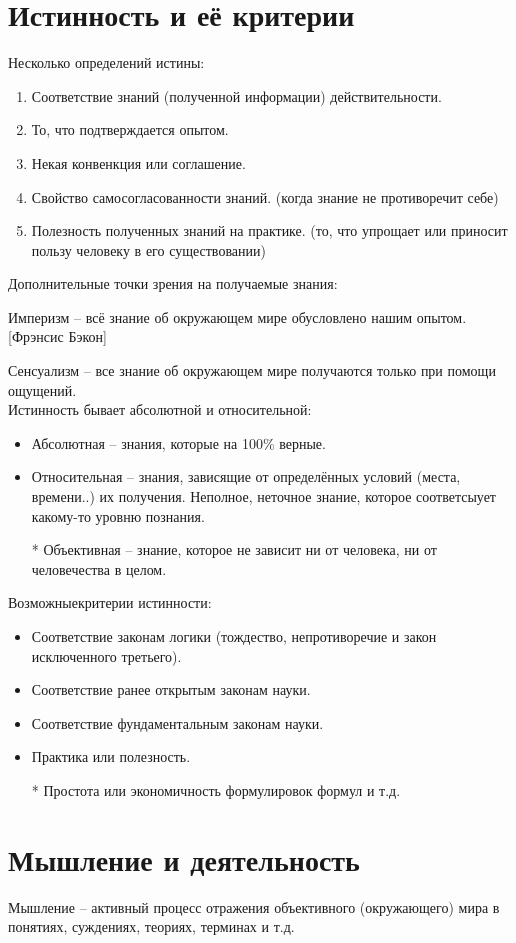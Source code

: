 \documentclass[12pt,a4paper]{book}
\begin{document}
\section{Истинность и её критерии}

Несколько определений истины:
\begin{enumerate}
	\item Соответствие знаний (полученной информации) действительности.
	\item То, что подтверждается опытом.
	\item Некая конвенкция или соглашение.
	\item Свойство самосогласованности знаний. (когда знание не противоречит себе)
	\item Полезность полученных знаний на практике. (то, что упрощает или приносит пользу человеку в его существовании)
\end{enumerate}
Дополнительные точки зрения на получаемые знания:

Империзм -- всё знание об окружающем мире обусловлено нашим опытом. [Фрэнсис Бэкон]

Сенсуализм -- все знание об окружающем мире получаются только при помощи ощущений.\\
Истинность бывает абсолютной и относительной:
\begin{itemize}
	\item Абсолютная -- знания, которые на 100\% верные.
	\item Относительная -- знания, зависящие от определённых условий (места, времени..) их получения. Неполное, неточное знание, которое соответсыует какому-то уровню познания.
	\item [*] Объективная -- знание, которое не зависит ни от человека, ни от человечества в целом.
\end{itemize}
Возможныекритерии истинности:
\begin{itemize}
	\item Соответствие законам логики (тождество, непротиворечие и закон исключенного третьего). 
	\item Соответствие ранее открытым законам науки. 
	\item Соответствие фундаментальным законам науки.
	\item Практика или полезность. 
	\item [*] Простота или экономичность формулировок формул и т.д.
\end{itemize}


\section{Мышление и деятельность}
Мышление -- активный процесс отражения объективного (окружающего) мира в понятиях, суждениях, теориях, терминах и т.д.
\end{document}
